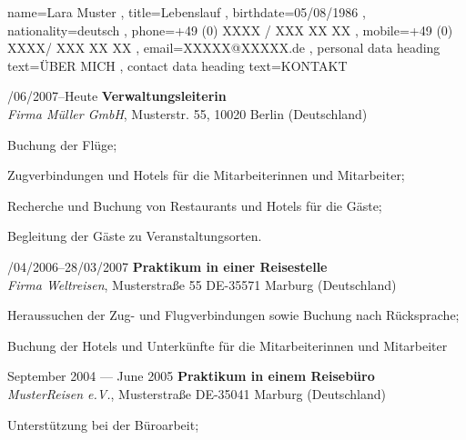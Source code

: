 \documentclass[a4paper, 12pt]{classycv}
\begin{document}
\begin{Resume}{%
	name=Lara Muster%
	, title=Lebenslauf%
	, birthdate={05/08/1986}%
	, nationality=deutsch%
	, phone=+49 (0) XXXX / XXX XX XX%
	, mobile=+49 (0) XXXX/ XXX XX XX%
	, email=XXXXX@XXXXX.de%
	, personal data heading text={\MakeUppercase{Über Mich}}%
	, contact data heading text={\MakeUppercase{Kontakt}}%
}%
%
%
\begin{Entry}{%
    \color{accent-color}/06/2007–Heute%
}{%
    \textbf{Verwaltungsleiterin}\\\textit{Firma Müller GmbH}, Musterstr. 55, 10020 Berlin (Deutschland)%
}%
    \begin{List}[skip above=0pt]%
		\item Buchung der Flüge;
		\item Zugverbindungen und Hotels für die Mitarbeiterinnen und Mitarbeiter;
		\item Recherche und Buchung von Restaurants und Hotels für die Gäste;
        \item Begleitung der Gäste zu Veranstaltungsorten.
	\end{List}
\end{Entry}
%
\begin{Entry}{%
    \color{accent-color}/04/2006–28/03/2007%
}{%
    \textbf{Praktikum in einer Reisestelle}\\\textit{Firma Weltreisen}, Musterstraße 55 DE-35571 Marburg (Deutschland)%
}%
    \begin{List}[skip above=0pt]%
        \item Heraussuchen der Zug- und Flugverbindungen sowie Buchung nach Rücksprache;
        \item Buchung der Hotels und Unterkünfte für die Mitarbeiterinnen und Mitarbeiter
    \end{List}
\end{Entry}
%
\begin{Entry}{%
    \color{accent-color}\selectfont September 2004 --- June 2005%
}{%
    \textbf{Praktikum in einem Reisebüro}\\\textit{MusterReisen e.V.}, Musterstraße DE-35041 Marburg (Deutschland)%
}%
    \begin{List}[skip above=0pt]%
        \item Unterstützung bei der Büroarbeit;

\end{List}
\end{Entry}
\end{Resume}
\end{document}
